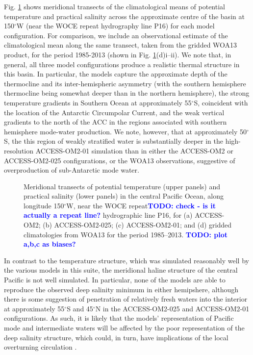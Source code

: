 \documentclass[gmd, manuscript]{copernicus}
\newcommand{\TODO}[1]{\textcolor{blue}{\textsf{\textbf{TODO: #1}}}}
\begin{document}
Fig. \ref{fig:Transect_Pacific} shows meridional transects of the climatological means of potential temperature and practical salinity across the approximate centre of the basin at 150$^{\circ}$W (near the WOCE repeat hydrography line P16) for each model configuration. For comparison, we include an observational estimate of the climatological mean along the same transect, taken from the gridded WOA13 product, for  the period 1985-2013 (shown in Fig. \ref{fig:Transect_Pacific}(d)i--ii). We note that, in general, all three model configurations produce a realistic thermal structure in this basin. In particular, the models capture the approximate depth of the thermocline and its inter-hemispheric asymmetry (with the southern hemisphere thermocline being somewhat deeper than in the northern hemisphere), the strong temperature gradients in Southern Ocean at approximately 55$^{\circ}$S, coincident with the location of the Antarctic Circumpolar Current, and the weak vertical gradients to the north of the ACC in the regions associated with southern hemisphere mode-water production. We note, however, that at approximately 50$^{\circ}$S, the this region of weakly stratified water is substantially deeper in the high-resolution ACCESS-OM2-01 simulation than in either the ACCESS-OM2 or ACCESS-OM2-025 configurations, or the WOA13 observations, suggestive of overproduction of sub-Antarctic mode water.        

\begin{figure}[t]
\caption{Meridional transects of potential temperature (upper panels) and practical salinity (lower panels) in the central Pacific Ocean, along longitude 150$^{\circ}$W, near the WOCE repeat\TODO{check - is it actually a repeat line?} hydrographic line P16, for (a)  ACCESS-OM2; (b) ACCESS-OM2-025; (c) ACCESS-OM2-01;  and (d) gridded climatologies from WOA13 for the period 1985--2013. 
\TODO{plot a,b,c as biases?}
\label{fig:Transect_Pacific}}
\end{figure}

In contrast to the temperature structure, which was simulated reasonably well by the various models in this suite, the meridional haline structure of the central Pacific is not well simulated. In particular, none of the models are able to reproduce the observed deep salinity minimum in either hemipshere, although there is some suggestion of penetration of relatively fresh waters into the interior at approximately 55$^{\circ}$S and 45$^{\circ}$N in the ACCESS-OM2-025 and ACCESS-OM2-01 configurations. As such, it is likely that the models' representation of Pacific mode and intermediate waters will be affected by the poor representation of the deep salinity structure, which could, in turn, have implications of the local overturning circulation \citep{Thompson2016}.
\end{document}
